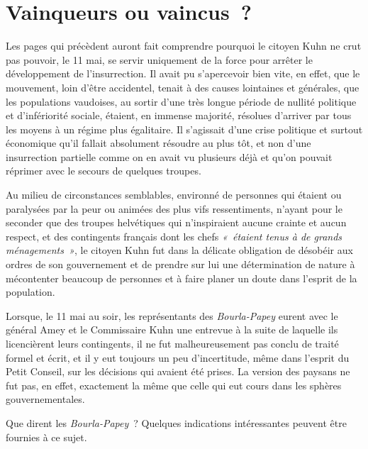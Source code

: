 \documentclass[french,twoside]{book} %
\newcommand\chaptercont{} %
\begin{document}
\chaptercont
\section[{Vainqueurs ou vaincus ?}]{Vainqueurs ou vaincus ?}
\noindent Les pages qui précèdent auront fait comprendre pourquoi le citoyen Kuhn ne crut pas pouvoir, le 11 mai, se servir uniquement de la force pour arrêter le développement de l’insurrection. Il avait pu s’apercevoir bien vite, en effet, que le mouvement, loin d’être accidentel, tenait à des causes lointaines et générales, que les populations vaudoises, au sortir d’une très longue période de nullité politique et d’infériorité sociale, étaient, en immense majorité, résolues d’arriver par tous les moyens à un régime plus égalitaire. Il s’agissait d’une crise politique et surtout économique qu’il fallait absolument résoudre au plus tôt, et non d’une insurrection partielle comme on en avait vu plusieurs déjà et qu’on pouvait réprimer avec le secours de quelques troupes.\par
Au milieu de circonstances semblables, environné de personnes qui étaient ou paralysées par la peur ou animées des plus vifs ressentiments, n’ayant pour le seconder que des troupes helvétiques qui n’inspiraient aucune crainte et aucun respect, et des contingents français dont les chefs \emph{« étaient tenus à de grands ménagements »}, le citoyen Kuhn fut dans la délicate obligation de désobéir aux ordres de son gouvernement et de prendre sur lui une détermination de nature à mécontenter beaucoup de personnes et à faire planer un doute dans l’esprit de la population.\par
Lorsque, le 11 mai au soir, les représentants des \emph{Bourla-Papey} eurent avec le général Amey et le Commissaire Kuhn une entrevue à la suite de laquelle ils licencièrent leurs contingents, il ne fut malheureusement pas conclu de traité formel et écrit, et il y eut toujours un peu d’incertitude, même dans l’esprit du Petit Conseil, sur les décisions qui avaient été prises. La version des paysans ne fut pas, en effet, exactement la même que celle qui eut cours dans les sphères gouvernementales.\par
Que dirent les \emph{Bourla-Papey} ? Quelques indications intéressantes peuvent être fournies à ce sujet.\par
\end{document}
